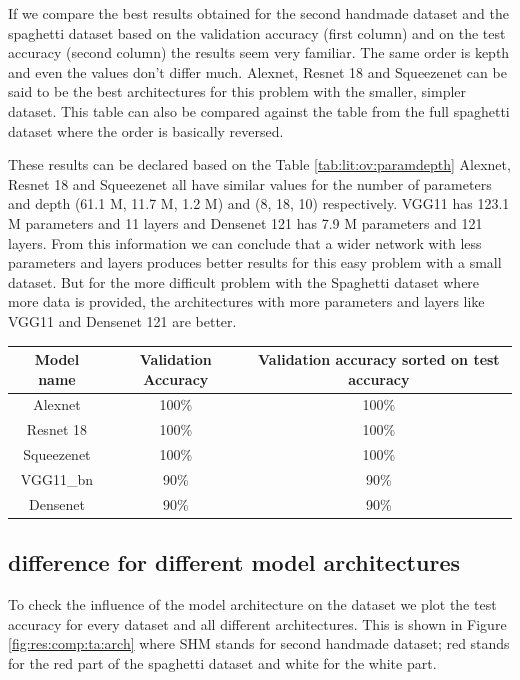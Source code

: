 	If we compare the best results obtained for the second handmade dataset and the spaghetti dataset based on the validation accuracy (first column) and on the test accuracy (second column) the results seem very familiar. The same order is kepth and even the values don't differ much. Alexnet, Resnet 18 and Squeezenet can be said to be the best architectures for this problem with the smaller, simpler dataset.
	This table can also be compared against the table from the full spaghetti dataset where the order is basically reversed. 
	
	These results can be declared based on the Table \ref{tab:lit:ov:paramdepth} 
	Alexnet, Resnet 18 and Squeezenet all have similar values for the number of parameters and depth (61.1 M, 11.7 M, 1.2 M) and (8, 18, 10) respectively. VGG11 has 123.1 M parameters and 11 layers and Densenet 121 has 7.9 M parameters and 121 layers. From this information we can conclude that a wider network with less parameters and layers produces better results for this easy problem with a small dataset. 
	But for the more difficult problem with the Spaghetti dataset where more data is provided, the architectures with more parameters and layers like VGG11 and Densenet 121 are better. 
	
		\begin{tabular}{ c | c c }
			Model name		& Validation Accuracy 	& Validation accuracy sorted on test accuracy	\\ \hline
			Alexnet			& 100\%							& 100\%					\\
			Resnet 18 		& 100\%						& 100\%					\\
		 	Squeezenet			& 100\%							& 100\%					\\
			VGG11\_bn 			& 90\%						& 90\%					\\
		 	Densenet 				& 90\%						& 90\% 				\\ 
		\end{tabular}
		
\subsection{difference for different model architectures}

	To check the influence of the model architecture on the dataset we plot the test accuracy for every dataset and all different architectures. This is shown in Figure \ref{fig:res:comp:ta:arch} where SHM stands for second handmade dataset; red stands for the red part of the spaghetti dataset and white for the white part.
	
